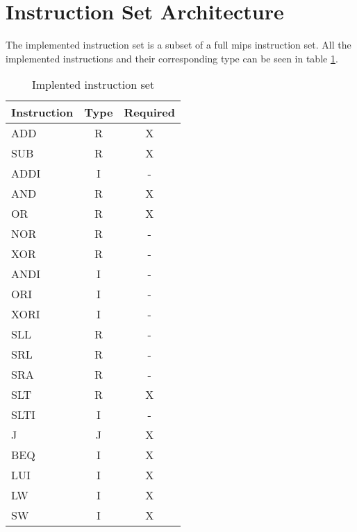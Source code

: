 \section{Instruction Set Architecture}
The implemented instruction set is a subset of a full \gls{mips} instruction set.
All the implemented instructions and their corresponding type can be seen in table \ref{table:instruction-types}.

\begin{table}[h]
  \centering
    \begin{tabular}{l|c|c}
    Instruction & Type & Required \\ \hline
    ADD         & R    & X        \\
    SUB         & R    & X        \\
    ADDI        & I    & -        \\
    AND         & R    & X        \\
    OR          & R    & X        \\
    NOR         & R    & -        \\
    XOR         & R    & -        \\
    ANDI        & I    & -        \\
    ORI         & I    & -        \\
    XORI        & I    & -        \\
    SLL         & R    & -        \\
    SRL         & R    & -        \\
    SRA         & R    & -        \\
    SLT         & R    & X        \\
    SLTI        & I    & -        \\
    J           & J    & X        \\
    BEQ         & I    & X        \\
    LUI         & I    & X        \\
    LW          & I    & X        \\
    SW          & I    & X        \\
    \end{tabular}
    \caption {Implented instruction set}
    \label{table:instruction-types}
\end{table}
